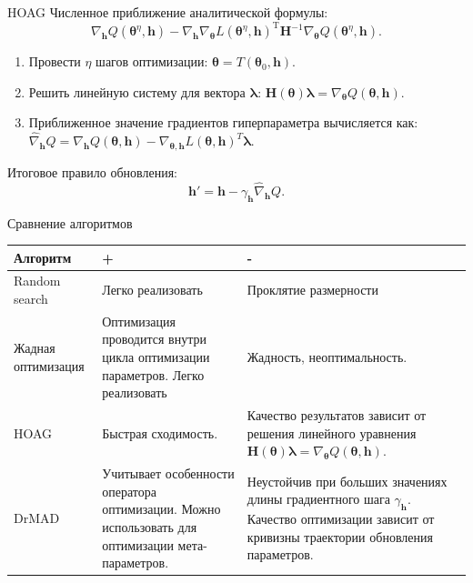 \documentclass[10pt,pdf,utf8,russian,aspectratio=169]{beamer}
\begin{document}
\begin{frame}{HOAG}
Численное приближение аналитической формулы:
 \[\nabla_{\mathbf{h}}Q(\boldsymbol{\theta}^\eta, \mathbf{h}) - \nabla_{\mathbf{h}}\nabla_{\boldsymbol{\theta}} L(\boldsymbol{\theta}^\eta, \mathbf{h})^\text{T}\mathbf{H}^{-1}\nabla_{\boldsymbol{\theta}}Q(\boldsymbol{\theta}^\eta, \mathbf{h}).\]
\begin{enumerate}
\item Провести $\eta$ шагов оптимизации: $\boldsymbol{\theta} = T(\boldsymbol{\theta}_0, \mathbf{h})$.
\item Решить линейную систему для вектора $\boldsymbol{\lambda}$: $\mathbf{H}(\boldsymbol{\theta})\boldsymbol{\lambda} =  \nabla_{\boldsymbol{\theta}} Q(\boldsymbol{\theta}, \mathbf{h})$.
\item Приближенное значение градиентов гиперпараметра вычисляется как: $\hat{\nabla}_{\mathbf{h}}Q = \nabla_{\mathbf{h}}Q(\boldsymbol{\theta}, \mathbf{h}) -\nabla_{\boldsymbol{\theta}, \mathbf{h}} L(\boldsymbol{\theta}, \mathbf{h})^T\boldsymbol{\lambda}$.
\end{enumerate}

Итоговое правило обновления:
\[
\label{eq:update_hyper}
\mathbf{h}' = \mathbf{h} - \gamma_{\mathbf{h}} \hat{\nabla}_{\mathbf{h}}Q.
\]


\end{frame}

\begin{frame}{Сравнение алгоритмов}
\begin{table}

\begin{tabularx}{\textwidth}{|p{2cm}|X|X|}
\hline
\bf Алгоритм &  \bf + & \bf -  \\ \hline
Random search & Легко реализовать & Проклятие размерности  \\ \hline
Жадная оптимизация & Оптимизация проводится внутри цикла оптимизации параметров. Легко реализовать & Жадность, неоптимальность. \\ \hline
HOAG  & Быстрая сходимость.  & Качество результатов зависит от решения линейного уравнения $\mathbf{H}(\boldsymbol{\theta})\boldsymbol{\lambda} =  \nabla_{\boldsymbol{\theta}} Q(\boldsymbol{\theta}, \mathbf{h})$.\\ \hline 
DrMAD  & Учитывает особенности оператора оптимизации. Можно использовать для оптимизации мета-параметров.& Неустойчив при больших значениях длины градиентного шага $\gamma_\mathbf{h}$. Качество оптимизации зависит от кривизны траектории обновления параметров.\\ \hline
\end{tabularx}


\label{table:algo_descr}

\end{table}
\end{frame}
\end{document}
